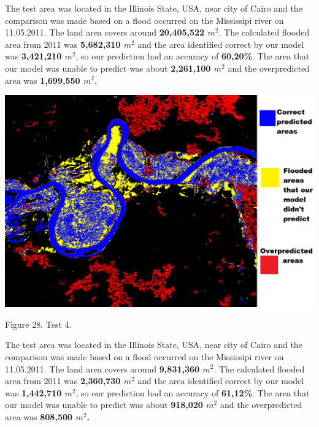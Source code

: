 \documentclass[12pt, a4paper]{report}
\begin{document}
The test area was located in the Illinois State, USA, near city of Cairo and the comparison was made based on a flood occurred on the Mississipi river on 11.05.2011. The land area covers around \textbf{20,405,522 $m^2$}. The calculated flooded area from 2011 was \textbf{5,682,310 $m^2$} and the area identified correct by our model was \textbf{3,421,210 $m^2$}, so our prediction had an accuracy of \textbf{60,20\%}. The area that our model was unable to predict was about \textbf{2,261,100 $m^2$} and the overpredicted area was \textbf{1,699,550 $m^2$.}

\newpage

\bigskip
\includegraphics[scale=0.5, center]{test_4.png}
\begin{center}
Figure 28. Test 4.
\end{center}
\par 

The test area was located in the Illinois State, USA, near city of Cairo and the comparison was made based on a flood occurred on the Mississipi river on 11.05.2011. The land area covers around \textbf{9,831,360 $m^2$}. The calculated flooded area from 2011 was \textbf{2,360,730 $m^2$} and the area identified correct by our model was \textbf{1,442,710 $m^2$}, so our prediction had an accuracy of \textbf{61,12\%}. The area that our model was unable to predict was about \textbf{918,020 $m^2$} and the overpredicted area was \textbf{808,500 $m^2$.}

\newpage
\end{document}

